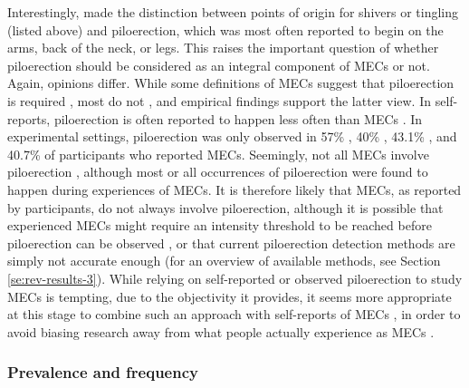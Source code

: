 Interestingly, \textcite{craig2005} made the distinction between points of origin for shivers or tingling (listed above) and piloerection, which was most often reported to begin on the arms, back of the neck, or legs. This raises the important question of whether piloerection should be considered as an integral component of MECs or not. Again, opinions differ. While some definitions of MECs suggest that piloerection is required \parencite{huron2010, panksepp1995}, most do not \parencite[e.g.,][]{blood2001, goldstein1980}, and empirical findings support the latter view. In self-reports, piloerection is often reported to happen less often than MECs \parencite{gabrielsson2011, silvia2011, sloboda1991}. In experimental settings, piloerection was only observed in 57\% \parencite{craig2005}, 40\% \parencite{benedek2011}, 43.1\% \parencite{sumpf2015}, and 40.7\% \parencite{wassiliwizky2017b} of participants who reported MECs. Seemingly, not all MECs involve piloerection \parencite{craig2005}, although most \parencite{benedek2011} or all \parencite{craig2005} occurrences of piloerection were found to happen during experiences of MECs. It is therefore likely that MECs, as reported by participants, do not always involve piloerection, although it is possible that experienced MECs might require an intensity threshold to be reached before piloerection can be observed \parencite{sumpf2015}, or that current piloerection detection methods are simply not accurate enough (for an overview of available methods, see Section \ref{se:rev-results-3}). While relying on self-reported or observed piloerection to study MECs is tempting, due to the objectivity it provides, it seems more appropriate at this stage to combine such an approach with self-reports of MECs \parencite[e.g.,][]{wassiliwizky2017b}, in order to avoid biasing research away from what people actually experience as MECs \parencite{maruskin2012}.

\subsubsection{Prevalence and frequency}

